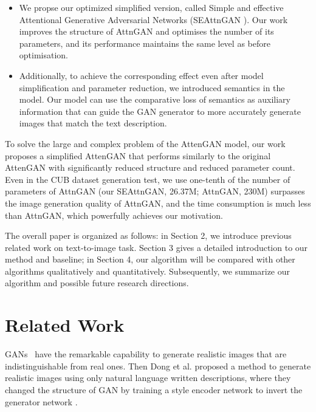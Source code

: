 \documentclass[runningheads, orivec]{llncs}
\begin{document}
\begin{itemize}
  \item We propse our optimized simplified version, called Simple and effective Attentional Generative Adversarial Networks (SEAttnGAN ). Our work improves the structure of AttnGAN and optimises the number of its parameters, and its performance maintains the same level as before optimisation. 
  \item Additionally, to achieve the corresponding effect even after model simplification and parameter reduction, we introduced semantics in the model. Our model can use the comparative loss of semantics as auxiliary information that can guide the GAN generator to more accurately generate images that match the text description. 
\end{itemize}
\par To solve the large and complex problem of the AttenGAN model, our work proposes a simplified AttenGAN that performs similarly to the original AttenGAN with significantly reduced structure and reduced parameter count. Even in the CUB dataset generation test, we use one-tenth of the number of parameters of AttnGAN (our SEAttnGAN, 26.37M; AttnGAN, 230M) surpasses the image generation quality of AttnGAN, and the time consumption is much less than AttnGAN, which powerfully achieves our motivation.

\par The overall paper is organized as follows: in Section 2, we introduce previous related work on text-to-image task. Section 3 gives a detailed introduction to our method and baseline; in Section 4, our algorithm will be compared with other algorithms qualitatively and quantitatively. Subsequently, we summarize our algorithm and possible future research directions.
\vspace{-10pt}

\section{Related Work} 

GANs~\cite{goodfellow2020generative}  have the remarkable capability to generate realistic images that are indistinguishable from real ones.
Then Dong et al. proposed a method to generate realistic images using only natural language written descriptions, where they changed the structure of GAN by training a style encoder network to invert the generator network  \cite{dong2017semantic}.
\end{document}
